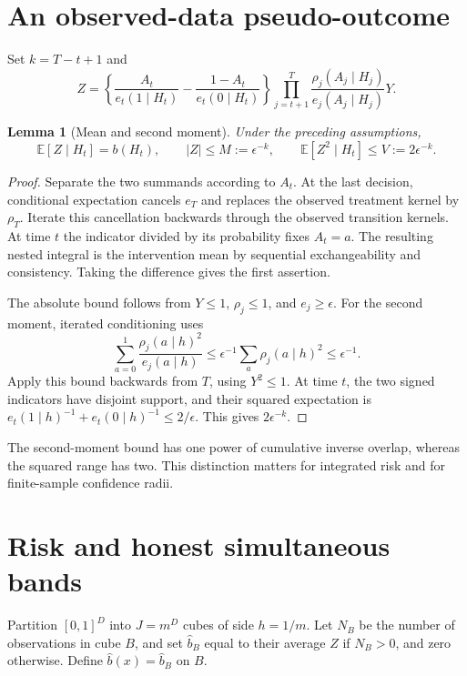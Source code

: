 \documentclass[11pt,a4paper]{article}
\newtheorem{lemma}[theorem]{Lemma}
\theoremstyle{definition}
\theoremstyle{remark}
\newcommand{\E}{\mathbb E}
\begin{document}
\section{An observed-data pseudo-outcome}
Set $k=T-t+1$ and
\[
 Z=\left\{\frac{A_t}{e_t(1\mid H_t)}-
             \frac{1-A_t}{e_t(0\mid H_t)}\right\}
       \prod_{j=t+1}^T\frac{\rho_j(A_j\mid H_j)}{e_j(A_j\mid H_j)}Y.
\]
\begin{lemma}[Mean and second moment]
Under the preceding assumptions,
\[
 \E[Z\mid H_t]=b(H_t),\qquad |Z|\le M:=\epsilon^{-k},
 \qquad \E[Z^2\mid H_t]\le V:=2\epsilon^{-k}.
\]
\end{lemma}
\begin{proof}
Separate the two summands according to $A_t$. At the last decision, conditional expectation cancels $e_T$ and replaces the observed treatment kernel by $\rho_T$. Iterate this cancellation backwards through the observed transition kernels. At time $t$ the indicator divided by its probability fixes $A_t=a$. The resulting nested integral is the intervention mean by sequential exchangeability and consistency. Taking the difference gives the first assertion.

The absolute bound follows from $Y\le1$, $\rho_j\le1$, and $e_j\ge\epsilon$. For the second moment, iterated conditioning uses
\[
 \sum_{a=0}^1\frac{\rho_j(a\mid h)^2}{e_j(a\mid h)}
 \le\epsilon^{-1}\sum_a\rho_j(a\mid h)^2\le\epsilon^{-1}.
\]
Apply this bound backwards from $T$, using $Y^2\le1$. At time $t$, the two signed indicators have disjoint support, and their squared expectation is
$e_t(1\mid h)^{-1}+e_t(0\mid h)^{-1}\le2/\epsilon$.
This gives $2\epsilon^{-k}$.
\end{proof}

The second-moment bound has one power of cumulative inverse overlap, whereas the squared range has two. This distinction matters for integrated risk and for finite-sample confidence radii.
\section{Risk and honest simultaneous bands}
Partition $[0,1]^D$ into $J=m^D$ cubes of side $h=1/m$. Let $N_B$ be the number of observations in cube $B$, and set $\hat b_B$ equal to their average $Z$ if $N_B>0$, and zero otherwise. Define $\hat b(x)=\hat b_B$ on $B$.
\end{document}
